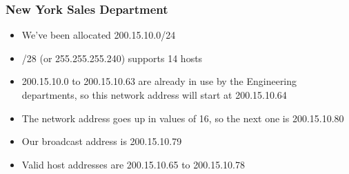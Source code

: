 \documentclass[pdflatex,compress]{beamer}
\begin{document}
\begin{frame}
	\frametitle{New York Sales Department}
	\begin{itemize}
		\item We’ve been allocated 200.15.10.0/24
	\end{itemize}
	\begin{itemize}
		\item /28 (or 255.255.255.240) supports 14 hosts
		\item 200.15.10.0 to 200.15.10.63 are already in use by the Engineering departments, so this network address will start at 200.15.10.64
		\item The network address goes up in values of 16, so the next one is 200.15.10.80
		\item Our broadcast address is 200.15.10.79
		\item Valid host addresses are 200.15.10.65 to 200.15.10.78
	\end{itemize}
\end{frame}
\end{document}
